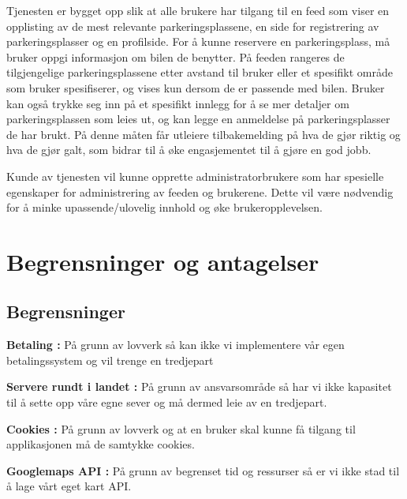 \documentclass[12pt]{article}
\begin{document}
Tjenesten er bygget opp slik at alle brukere har tilgang til en feed som viser en opplisting av de mest relevante parkeringsplassene, en side for registrering av parkeringsplasser og en profilside. For å kunne reservere en parkeringsplass, må bruker oppgi informasjon om bilen de benytter. På feeden rangeres de tilgjengelige parkeringsplassene etter avstand til bruker eller et spesifikt område som bruker spesifiserer, og vises kun dersom de er passende med bilen. Bruker kan også trykke seg inn på et spesifikt innlegg for å se mer detaljer om parkeringsplassen som leies ut, og kan legge en anmeldelse på parkeringsplasser de har brukt. På denne måten får utleiere tilbakemelding på hva de gjør riktig og hva de gjør galt, som bidrar til å øke engasjementet til å gjøre en god jobb.

Kunde av tjenesten vil kunne opprette administratorbrukere som har spesielle egenskaper for administrering av feeden og brukerene. Dette vil være nødvendig for å minke upassende/ulovelig innhold og øke brukeropplevelsen.

\section{Begrensninger og antagelser}

    \subsection{Begrensninger}
    \textbf{Betaling :} På grunn av lovverk så kan ikke vi implementere vår egen betalingssystem og vil trenge en tredjepart
    
    \textbf{Servere rundt i landet :} På grunn av ansvarsområde så har vi ikke kapasitet til å sette opp våre egne sever og må dermed leie av en tredjepart.
    
    \textbf{Cookies :} På grunn av lovverk og at en bruker skal kunne få tilgang til applikasjonen må de samtykke cookies.
    
    \textbf{Googlemaps API :} På grunn av begrenset tid og ressurser så er vi ikke stad til å lage vårt eget kart API.
\end{document}
